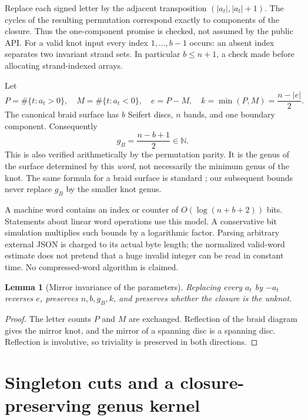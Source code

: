 \documentclass[11pt,letterpaper]{article}
\newtheorem{lemma}[theorem]{Lemma}
\theoremstyle{definition}
\newcommand{\N}{\mathbb N}
\begin{document}
Replace each signed letter by the adjacent transposition $(|a_t|,|a_t|+1)$. The cycles of the resulting permutation correspond exactly to components of the closure. Thus the one-component promise is checked, not assumed by the public API. For a valid knot input every index $1,\ldots,b-1$ occurs: an absent index separates two invariant strand sets. In particular $b\le n+1$, a check made before allocating strand-indexed arrays.

Let
\begin{equation}
 P=\#\{t:a_t>0\},\quad M=\#\{t:a_t<0\},\quad
 e=P-M,\quad k=\min(P,M)=\frac{n-|e|}{2}.
 \label{eq:parameters}
\end{equation}
The canonical braid surface has $b$ Seifert discs, $n$ bands, and one boundary component. Consequently
\begin{equation}
 g_B=\frac{n-b+1}{2}\in\N.
 \label{eq:braidgenus}
\end{equation}
This is also verified arithmetically by the permutation parity. It is the genus of the surface determined by this \emph{word}, not necessarily the minimum genus of the knot. The same formula for a braid surface is standard \cite{vancott}; our subsequent bounds never replace $g_B$ by the smaller knot genus.

A machine word contains an index or counter of $O(\log(n+b+2))$ bits. Statements about linear word operations use this model. A conservative bit simulation multiplies such bounds by a logarithmic factor. Parsing arbitrary external JSON is charged to its actual byte length; the normalized valid-word estimate does not pretend that a huge invalid integer can be read in constant time. No compressed-word algorithm is claimed.

\begin{lemma}[Mirror invariance of the parameters]
Replacing every $a_t$ by $-a_t$ reverses $e$, preserves $n,b,g_B,k$, and preserves whether the closure is the unknot.
\end{lemma}
\begin{proof}
The letter counts $P$ and $M$ are exchanged. Reflection of the braid diagram gives the mirror knot, and the mirror of a spanning disc is a spanning disc. Reflection is involutive, so triviality is preserved in both directions.
\end{proof}

\section{Singleton cuts and a closure-preserving genus kernel}
\label{sec:genuskernel}
\end{document}
